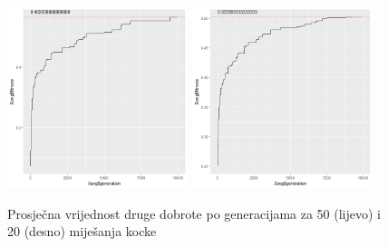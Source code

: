 \documentclass[times, utf8, seminar, numeric]{fer}
\begin{document}
  		\begin{figure}[ht!]
			\centering
			\includegraphics[width=0.47\textwidth]{../results/cubies_fitness/50_scrambles/cross0,5greedy10mut20.png}
			\includegraphics[width=0.47\textwidth]{../results/cubies_fitness/20_scrambles/cross0,5greedy10mut20.png}
			\caption{Prosječna vrijednost druge dobrote po generacijama za 50 (lijevo) i 20 (desno) miješanja kocke }
		\end{figure}
\end{document}
